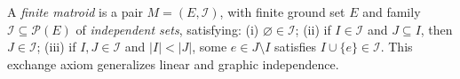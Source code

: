 
A \emph{finite matroid} is a pair $M=(E,\mathcal I)$, with finite ground set $E$ and family $\mathcal I\subseteq\mathcal P(E)$ of \emph{independent sets}, satisfying: (i) $\varnothing\in\mathcal I$; (ii) if $I\in\mathcal I$ and $J\subseteq I$, then $J\in\mathcal I$; (iii) if $I,J\in\mathcal I$ and $|I|<|J|$, some $e\in J\setminus I$ satisfies $I\cup\{e\}\in\mathcal I$. This exchange axiom generalizes linear and graphic independence.
